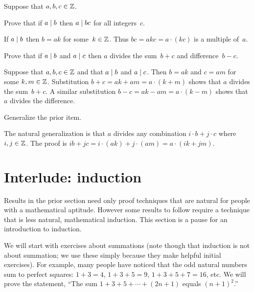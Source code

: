 \documentclass{ibl}  %
\begin{document}
\begin{problem} \label{ex:DividesAndLinearCombinations}
Suppose that $a,b,c\in\mathbb{Z}$.
\begin{exes}
\begin{exercise}
  Prove that if $a\mid b$ then $a\mid bc$ for all integers~$c$.
\end{exercise}
\begin{answer}
  If $a\mid b$ then $b=ak$ for some~$k\in\mathbb{Z}$.
  Thus $bc=akc=a\cdot(kc)$ is a multiple of~$a$.
\end{answer}
\begin{exercise}
  Prove that if $a\mid b$ and $a\mid c$ then $a$ divides the 
  sum~$b+c$ and difference~$b-c$.
\end{exercise}
\begin{answer}
  Suppose that $a,b,c\in\mathbb{Z}$ and that $a\mid b$ and $a\mid c$.
  Then $b=ak$ and $c=am$ for some $k,m\in\mathbb{Z}$. 
  Substitution  
  $b+c=ak+am=a\cdot(k+m)$
  shows that $a$ divides the sum~$b+c$.
  A similar substitution
  $b-c=ak-am=a\cdot(k-m)$
  shows that $a$ divides the difference.
\end{answer}
\begin{exercise}  %
   Generalize the prior item.
\end{exercise}
\begin{answer}
  The natural generalization is that $a$ divides any combination
  $i\cdot b+j\cdot c$ where $i,j\in\mathbb{Z}$.
  The proof is
  $ib+jc=i\cdot (ak)+j\cdot(am)=a\cdot(ik+jm)$.
\end{answer}
\end{exes}
\end{problem}




\section{Interlude: induction}
Results in the prior section need only proof techniques that are natural
for people with a mathematical aptitude.
However some results to follow require a technique 
that is less natural, mathematical induction.
This section is a pause for an introduction to induction.

We will start with exercises about summations 
(note though that induction is not about summation;
we use these simply because they make helpful initial exercises).
For example, many people have noticed that the odd natural numbers sum to 
perfect squares: $1+3=4$, $1+3+5=9$, $1+3+5+7=16$, etc.
We will prove the statement,
``The sum $1+3+5+\cdots+(2n+1)$ equals $(n+1)^2$.'' 
\end{document}
